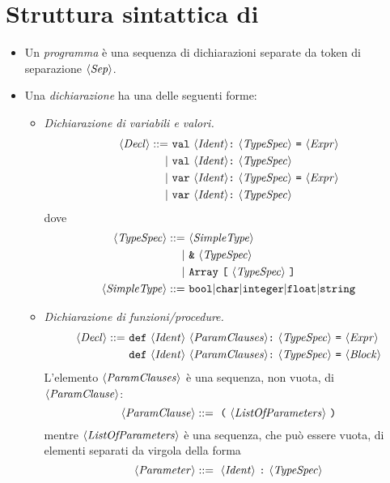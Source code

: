 \section{Struttura sintattica di \SBF}
\begin{itemize}
\item Un \emph{programma} è una sequenza di dichiarazioni separate da token di separazione $\langle \mathit{Sep} \rangle$.


\item Una \emph{dichiarazione} ha una delle seguenti forme:
\begin{itemize}
	\item \emph{Dichiarazione di variabili e valori.}
	\begin{align*}
	\token{Decl} ::=\ &\texttt{val}\ \token{Ident} \texttt{:}\ \token{TypeSpec}\ \texttt{=}\ \token{Expr}\\
	|\ &\texttt{val}\ \token{Ident} \texttt{:}\ \token{TypeSpec}\\
	|\ &\texttt{var}\ \token{Ident} \texttt{:}\ \token{TypeSpec}\ \texttt{=}\ \token{Expr}\\
	|\ &\texttt{var}\ \token{Ident} \texttt{:}\ \token{TypeSpec}
	\end{align*}
	dove
	\begin{align*}
	\langle \mathit{TypeSpec} \rangle ::=\ &\langle \mathit{SimpleType} \rangle\\
	|\ &\texttt{\&}\ \langle \mathit{TypeSpec} \rangle\\
	|\ &\texttt{Array}\ \texttt{[}\ \langle \mathit{TypeSpec} \rangle\ \texttt{]}\\
	\langle \mathit{SimpleType} \rangle ::=\ &\texttt{bool}| \texttt{char}| \texttt{integer}| \texttt{float}| \texttt{string}
	\end{align*}
	\item \emph{Dichiarazione di funzioni/procedure.}
	\begin{align*}
	\token{Decl} ::=\ & \texttt{def}\ \token{Ident}\ \token{ParamClauses} \texttt{:}\ \token{TypeSpec}\ \texttt{=}\ \token{Expr}\\
	& \texttt{def}\ \token{Ident}\ \token{ParamClauses} \texttt{:}\ \token{TypeSpec}\ \texttt{=}\ \token{Block}
	\end{align*}
	L'elemento $\langle \mathit{ParamClauses} \rangle$ è una sequenza, non vuota, di $\langle \mathit{ParamClause} \rangle$:
	\begin{equation*}
	\token{ParamClause} ::=\ \texttt{(}\ \token{ListOfParameters}\ \texttt{)}
	\end{equation*}
	mentre $\langle \mathit{ListOfParameters} \rangle$ è una sequenza, che può essere vuota, di elementi separati da virgola della forma
	\begin{equation*}
	\token{Parameter} ::=\ \token{Ident}\ \texttt{:}\ \token{TypeSpec}
	\end{equation*}
	

\end{itemize}
\end{itemize}
